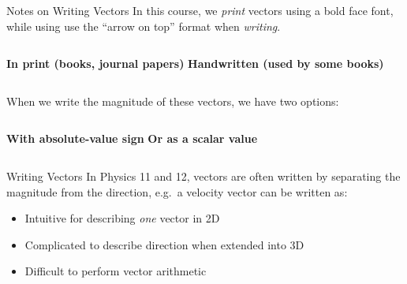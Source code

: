 \documentclass[12pt,compress,aspectratio=169]{beamer}
\newcommand{\mb}[1]{\ensuremath\mathbf{#1}}
\newcommand{\eq}[2]{\vspace{#1}{\Large\begin{displaymath}#2\end{displaymath}}}
\begin{document}
\begin{frame}{Notes on  Writing Vectors}
  In this course, we \emph{print} vectors using a bold face font, while using
  use the ``arrow on top'' format when \emph{writing}.
  \vspace{.1in}
  \begin{columns}
    \textbf{In print (books, journal papers)}
    \textbf{Handwritten (used by some books)}
  \end{columns}

  When we write the magnitude of these vectors, we have two options:
  \vspace{.1in}
  \begin{columns}
    \textbf{With absolute-value sign}
    \textbf{Or as a scalar value}
      \vspace{-.2in}{\LARGE
        \begin{displaymath}
          v\quad F_g\quad p \quad I
        \end{displaymath}
      }
  \end{columns}
\end{frame}


\begin{frame}{Writing Vectors}
  In Physics 11 and 12, vectors are often written by separating the magnitude
  from the direction, e.g.\ a velocity vector can be written as:
  
  \eq{-.1in}{
    \mb{v}=\SI{4.5}{m/s}\text{ [N \ang{55} E]}
  }

  \begin{itemize}
  \item Intuitive for describing \emph{one} vector in 2D
  \item Complicated to describe direction when extended into 3D
  \item Difficult to perform vector arithmetic
  \end{itemize}
\end{frame}
\end{document}
